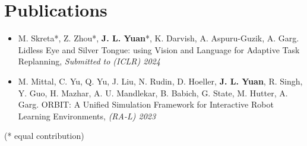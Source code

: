 \documentclass[letterpaper,11pt]{article}
\begin{document}
\section{Publications}
  \begin{itemize}[leftmargin=0.15in, label={}]
    \item{
    \small{M. Skreta*, Z. Zhou*,  \textbf{J. L. Yuan}*, K. Darvish, A. Aspuru-Guzik, A. Garg. Lidless Eye and Silver Tongue: using Vision and Language for Adaptive Task Replanning, \textit{Submitted to (ICLR) 2024}}
    }
  \end{itemize}\vspace{-15pt}
\begin{itemize}[leftmargin=0.15in, label={}]
    \item{
    \small{M. Mittal, C. Yu, Q. Yu, J. Liu, N. Rudin, D. Hoeller, \textbf{J. L. Yuan}, R. Singh, Y. Guo, H. Mazhar, A. U. Mandlekar, B. Babich, G. State, M. Hutter, A. Garg. ORBIT: A Unified Simulation Framework for Interactive Robot Learning Environments, \textit{(RA-L) 2023}}
    }
 \end{itemize}\vspace{-15pt}
 (* equal contribution)
\end{document}
